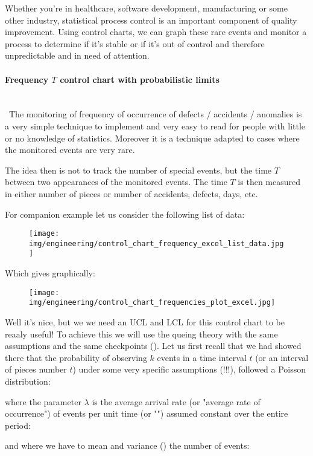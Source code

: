 	Whether you're in healthcare, software development, manufacturing or some other industry, statistical process control is an important component of quality improvement. Using control charts, we can graph these rare events and monitor a process to determine if it's stable or if it's out of control and therefore unpredictable and in need of attention.
	
	\paragraph{Frequency $T$ control chart with probabilistic limits}\mbox{}\\\
	The monitoring of frequency of occurrence of defects / accidents / anomalies is a very simple technique to implement and very easy to read for people with little or no knowledge of statistics. Moreover it is a technique adapted to cases where the monitored events are very rare.

	The idea then is not to track the number of special events, but the time $T$ between two appearances of the monitored events. The time $T$ is then measured in either number of pieces or number of accidents, defects, days, etc.

	For companion example let us consider the following list of data:
	\begin{figure}[H]
		\centering
		\texttt{[image: img/engineering/control\_chart\_frequency\_excel\_list\_data.jpg]}
	\end{figure}
	Which gives graphically:
	\begin{figure}[H]
		\centering
		\texttt{[image: img/engineering/control\_chart\_frequencies\_plot\_excel.jpg]}
	\end{figure}
	Well it's nice, but we we need an UCL and LCL for this control chart to be reaaly useful! To achieve this we will use the queing theory with the same assumptions and the same checkpoints (). Let us first recall that we had showed there  that the probability of observing $k$ events in a time interval $t$ (or an interval of pieces number $t$) under some very specific assumptions (!!!), followed a Poisson distribution:
	
	where the parameter $\lambda$ is the average arrival rate (or "average rate of occurrence") of events per unit time (or "") assumed constant over the entire period:
	
	and where we have to mean and variance () the number of events:
	
